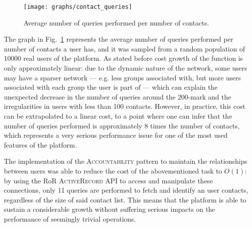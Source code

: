 \begin{figure}[H]
  \centering
  \texttt{[image: graphs/contact\_queries]}
  \caption{Average number of queries performed per number of contacts.}
  \label{fig:contact_queries}
\end{figure}

The graph in Fig.~\ref{fig:contact_queries} represents the average number of queries performed per number of contacts a user has, and it was sampled from a random population of 10000 real users of the platform. As stated before cost growth of the function is only approximately linear: due to the dynamic nature of the network, some users may have a sparser network --- e.g. less groups associated with, but more users associated with each group the user is part of --- which can explain the unexpected decrease in the number of queries around the 200-mark and the irregularities in users with less than 100 contacts. However, in practice, this cost can be extrapolated to a linear cost, to a point where one can infer that the number of queries performed is approximately 8 times the number of contacts, which represents a very serious performance issue for one of the most used features of the platform.


The implementation of the \textsc{Accountability} pattern to maintain the relationships between users was able to reduce the cost of the abovementioned task to $O(1)$: by using the RoR \textsc{ActiveRecord} API to access and manipulate these connections, only 11 queries are performed to fetch and identify an user contacts, regardless of the size of said contact list. This means that the platform is able to sustain a considerable growth without suffering serious impacts on the performance of seemingly trivial operations.

